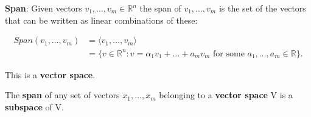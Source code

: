 \documentclass[12pt]{article}
\newenvironment{definition}[2][Definition]{\begin{trivlist}
\item[\hskip \labelsep {\bfseries #1}\hskip \labelsep {\bfseries #2}]}{\end{trivlist}}
\newenvironment{lemma}[2][Lemma]{\begin{trivlist}
\item[\hskip \labelsep {\bfseries #1}\hskip \labelsep {\bfseries #2}]}{\end{trivlist}}
\begin{document}
\begin{definition}{1.2} \textbf{Span}: Given vectors \(v_1,\dots, v_m \in \mathbb{R}^n\) the span of \(v_1,\dots, v_m\) is the set of the vectors that can be written as linear combinations of these:

\begin{equation}
\begin{split}
Span(v_1,\dots, v_m) &= \langle v_1,\dots, v_m \rangle \\
&= \big\{ v \in \mathbb{R}^n : v = \alpha_1 v_1 + \dots + a_m v_m \textrm{ for some } a_1,\dots,a_m \in \mathbb{R} \big\}.
\end{split}
\end{equation}

\noindent
This is a \textbf{vector space}.
\end{definition}

\begin{lemma}{1.0} The \textbf{span} of any set of vectors \(x_1,\dots,x_m\) belonging to a \textbf{vector space} V is a \textbf{subspace} of V.
\end{lemma}
\end{document}
